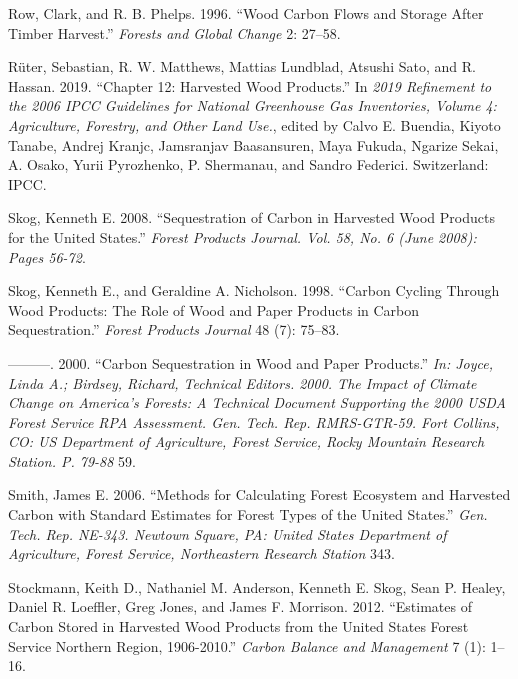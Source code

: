\documentclass[
  openany]{book}
\newlength{\cslhangindent}
\newlength{\cslentryspacingunit} %
\newenvironment{CSLReferences}[2] %
 {%
  \setlength{\parindent}{0pt}
  \ifodd #1
  \let\oldpar\par
  \def\par{\hangindent=\cslhangindent\oldpar}
  \fi
  \setlength{\parskip}{#2\cslentryspacingunit}
 }%
 {}
\begin{document}
\begin{CSLReferences}{1}{0}
\leavevmode{}%
Row, Clark, and R. B. Phelps. 1996. {``Wood Carbon Flows and Storage
After Timber Harvest.''} \emph{Forests and Global Change} 2: 27--58.

\leavevmode{}%
Rüter, Sebastian, R. W. Matthews, Mattias Lundblad, Atsushi Sato, and R.
Hassan. 2019. {``Chapter 12: Harvested Wood Products.''} In \emph{2019
Refinement to the 2006 IPCC Guidelines for National Greenhouse Gas
Inventories, Volume 4: Agriculture, Forestry, and Other Land Use.},
edited by Calvo E. Buendia, Kiyoto Tanabe, Andrej Kranjc, Jamsranjav
Baasansuren, Maya Fukuda, Ngarize Sekai, A. Osako, Yurii Pyrozhenko, P.
Shermanau, and Sandro Federici. Switzerland: IPCC.

\leavevmode{}%
Skog, Kenneth E. 2008. {``Sequestration of Carbon in Harvested Wood
Products for the United States.''} \emph{Forest Products Journal. Vol.
58, No. 6 (June 2008): Pages 56-72}.

\leavevmode{}%
Skog, Kenneth E., and Geraldine A. Nicholson. 1998. {``Carbon Cycling
Through Wood Products: The Role of Wood and Paper Products in Carbon
Sequestration.''} \emph{Forest Products Journal} 48 (7): 75--83.

\leavevmode{}%
---------. 2000. {``Carbon Sequestration in Wood and Paper Products.''}
\emph{In: Joyce, Linda A.; Birdsey, Richard, Technical Editors. 2000.
The Impact of Climate Change on America's Forests: A Technical Document
Supporting the 2000 USDA Forest Service RPA Assessment. Gen. Tech. Rep.
RMRS-GTR-59. Fort Collins, CO: US Department of Agriculture, Forest
Service, Rocky Mountain Research Station. P. 79-88} 59.

\leavevmode{}%
Smith, James E. 2006. {``Methods for Calculating Forest Ecosystem and
Harvested Carbon with Standard Estimates for Forest Types of the United
States.''} \emph{Gen. Tech. Rep. NE-343. Newtown Square, PA: United
States Department of Agriculture, Forest Service, Northeastern Research
Station} 343.

\leavevmode{}%
Stockmann, Keith D., Nathaniel M. Anderson, Kenneth E. Skog, Sean P.
Healey, Daniel R. Loeffler, Greg Jones, and James F. Morrison. 2012.
{``Estimates of Carbon Stored in Harvested Wood Products from the United
States Forest Service Northern Region, 1906-2010.''} \emph{Carbon
Balance and Management} 7 (1): 1--16.


\end{CSLReferences}
\end{document}
